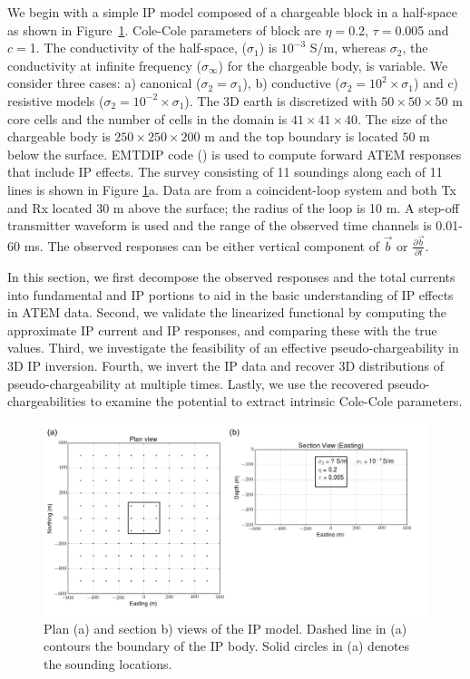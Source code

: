 \documentclass[a4paper, 11pt]{article}
\newcommand{\siginf}{\sigma_\infty}
\renewcommand {\b}  { {\vec b} }
\begin{document}
We begin with a simple IP model composed of  a chargeable block in a half-space as shown in Figure~\ref{F: IPModel}.
Cole-Cole parameters of block are  $\eta=$0.2, $\tau=$0.005 and $c=$1.
The conductivity  of the half-space, ($\sigma_1$) is  $10^{-3}$ S/m, whereas $\sigma_2$, 
the conductivity at infinite frequency ($\siginf$) for the chargeable body, is variable.  
We consider three cases: a) canonical ($\sigma_2=\sigma_1$), b) conductive ($\sigma_2=10^2\times\sigma_1$) and c) resistive models ($\sigma_2=10^{-2}\times\sigma_1$).
The 3D earth is discretized with  $50\times50\times50$ m core cells and the number of cells in the domain is $41\times41\times40$.
The size of the chargeable body is $250\times250\times200$ m and the top boundary is located  $50$ m below the surface.
EMTDIP code (\cite{Marchant2014}) is used to compute forward ATEM responses that include IP effects. The survey consisting of 11 soundings along each of 11 lines is shown in Figure \ref{F: IPModel}a.
Data are from a  coincident-loop system and both Tx and Rx located 30 m above the surface; the radius of the loop is 10 m.
A step-off transmitter waveform is used and the range of the observed time channels is 0.01-60 ms. The observed responses can be either vertical component of $\b$ or $\frac{\partial \b}{\partial t}$.

In this section, we first decompose the observed responses and the total currents into fundamental and IP portions to aid in the basic understanding of IP effects in ATEM data. 
Second, we validate the linearized functional by computing the approximate IP current and IP responses, and comparing these  with the true values. 
Third, we investigate the feasibility of an effective pseudo-chargeability in 3D IP inversion. 
Fourth, we invert the IP data and recover 3D distributions of pseudo-chargeability at multiple times.  Lastly, we use the recovered pseudo-chargeabilities to examine the potential to extract intrinsic Cole-Cole parameters. 

\begin{figure}[htb]
  \centering
  \includegraphics[width=1.0\textwidth]{figures/IPModel.png}
  \caption{Plan (a) and section b) views of the IP model. Dashed line in (a) contours the boundary of the IP body. Solid circles in (a) denotes the sounding locations.}
  \label{F: IPModel}
\end{figure}
\clearpage
\end{document}
